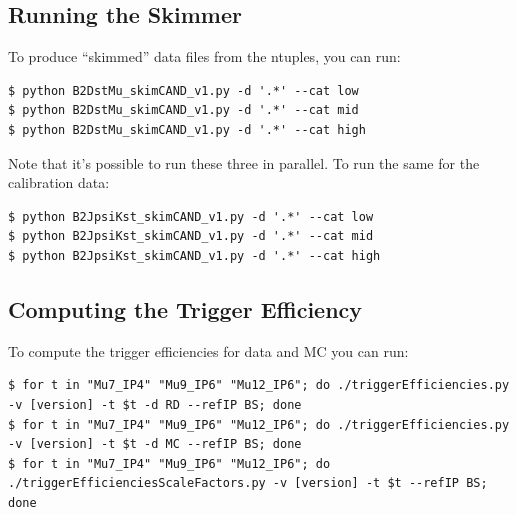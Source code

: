 \documentclass[12pt]{report}
\begin{document}
\subsection{Running the Skimmer}
To produce ``skimmed'' data files from the ntuples, you can run:
\begin{mdframed}[backgroundcolor=light-gray, roundcorner=10pt,leftmargin=1, rightmargin=1, innerleftmargin=15, innertopmargin=15,innerbottommargin=15, outerlinewidth=1, linecolor=light-gray,roundcorner=20pt]
\begin{lstlisting}
$ python B2DstMu_skimCAND_v1.py -d '.*' --cat low
$ python B2DstMu_skimCAND_v1.py -d '.*' --cat mid
$ python B2DstMu_skimCAND_v1.py -d '.*' --cat high
\end{lstlisting}
\end{mdframed}
Note that it's possible to run these three in parallel. To run the same for the calibration data:
\begin{mdframed}[backgroundcolor=light-gray, roundcorner=10pt,leftmargin=1, rightmargin=1, innerleftmargin=15, innertopmargin=15,innerbottommargin=15, outerlinewidth=1, linecolor=light-gray,roundcorner=20pt]
\begin{lstlisting}
$ python B2JpsiKst_skimCAND_v1.py -d '.*' --cat low
$ python B2JpsiKst_skimCAND_v1.py -d '.*' --cat mid
$ python B2JpsiKst_skimCAND_v1.py -d '.*' --cat high
\end{lstlisting}
\end{mdframed}
\subsection{Computing the Trigger Efficiency}
To compute the trigger efficiencies for data and MC you can run:
\begin{mdframed}[backgroundcolor=light-gray, roundcorner=10pt,leftmargin=1, rightmargin=1, innerleftmargin=15, innertopmargin=15,innerbottommargin=15, outerlinewidth=1, linecolor=light-gray,roundcorner=20pt]
\begin{lstlisting}
$ for t in "Mu7_IP4" "Mu9_IP6" "Mu12_IP6"; do ./triggerEfficiencies.py -v [version] -t $t -d RD --refIP BS; done
$ for t in "Mu7_IP4" "Mu9_IP6" "Mu12_IP6"; do ./triggerEfficiencies.py -v [version] -t $t -d MC --refIP BS; done
$ for t in "Mu7_IP4" "Mu9_IP6" "Mu12_IP6"; do ./triggerEfficienciesScaleFactors.py -v [version] -t $t --refIP BS; done
\end{lstlisting}
\end{mdframed}
\end{document}
